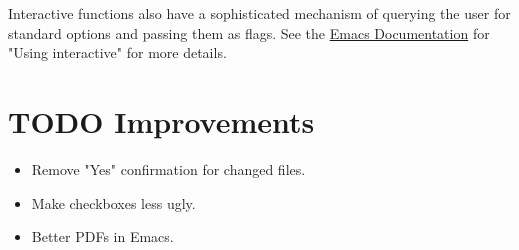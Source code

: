\documentclass[11pt]{article}
\begin{document}
Interactive functions also have a sophisticated mechanism of querying the user
for standard options and passing them as flags. See the \href{https://www.gnu.org/software/emacs/manual/html\_node/elisp/Using-Interactive.html}{Emacs Documentation} for
"Using interactive" for more details.
\section{{\bfseries\sffamily TODO} Improvements}
\label{sec:orgaeceefe}

\begin{itemize}
\item Remove "Yes" confirmation for changed files.
\item Make checkboxes less ugly.
\item Better PDFs in Emacs.
\end{itemize}
\end{document}
